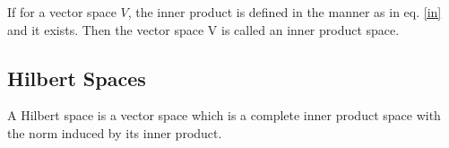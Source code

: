 \documentclass[a4paper,12pt]{article}
\newcommand\norm[1]{\left\lVert#1\right\rVert}
\begin{document}
		If for a vector space $V$, the inner product is defined in the manner as in eq. \ref{in} and it exists. Then the vector space V is called an inner product space.
%			
%			
	\subsection{Hilbert Spaces}
	A Hilbert space is a vector space which is a complete inner product space with the norm induced by its inner product.
\end{document}
